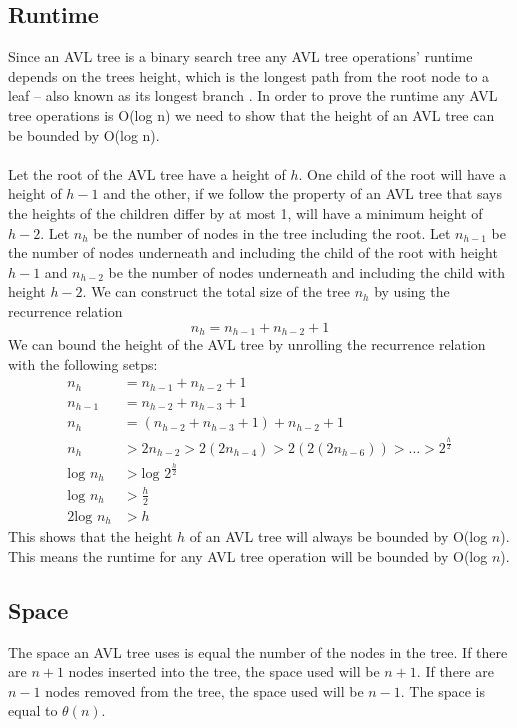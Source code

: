 \documentclass[12pt]{article}
\begin{document}
\subsection*{Runtime}
Since an AVL tree is a binary search tree any AVL tree operations' runtime
depends on the trees height, which is the longest path from the root node to a
leaf -- also known as its longest branch \cite{avl-runtime}.  In order to prove
the runtime any AVL tree operations is O(log n) we need to show that the height of an AVL tree
can be bounded by O(log n).\\
\\
Let the root of the AVL tree have a height of $h$.  
One child of the root will have a height of $h-1$ and the other, if we follow 
the property of an AVL tree that says the heights of the children differ by at 
most 1, will have a minimum height of $h-2$.  Let $n_h$ be the number of nodes
in the tree including the root.  Let $n_{h-1}$ be the number of nodes underneath
and including the child of the root with height $h-1$ and $n_{h-2}$ be the
number of nodes underneath and including the child with height $h-2$.  We can
construct the total size of the tree $n_h$ by using the recurrence relation
$$
n_h = n_{h-1} + n_{h-2} + 1
$$
We can bound the height of the AVL tree by unrolling the recurrence relation
with the following setps:
\begin{align}
n_h &= n_{h-1} + n_{h-2} + 1\\
n_{h-1} &= n_{h-2} + n_{h-3} + 1\\
n_h &= (n_{h-2} + n_{h-3} + 1) + n_{h-2} + 1\\
n_h &> 2n_{h-2} > 2(2n_{h-4}) > 2(2(2n_{h-6})) > \ldots > 2^{\frac{h}{2}}\\
\text{log }n_h &> \text{log }2^{\frac{h}{2}}\\
\text{log }n_h &> \frac{h}{2}\\
2\text{log }n_h &> h
\end{align}
This shows that the height $h$ of an AVL tree will always be bounded by
O(log $n$).
This means the runtime for any AVL tree operation will be bounded by O(log $n$).
\subsection*{Space}
The space an AVL tree uses is equal the number of the nodes in the tree.  If
there are $n + 1$ nodes inserted into the tree, the space used will be $n + 1$. 
If there are $n - 1$ nodes removed from the tree, the space used will be $n-1$. 
The space is equal to $\theta(n)$.
\end{document}
